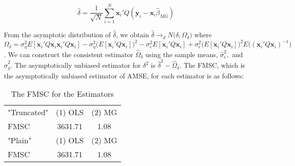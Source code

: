 \[
\widehat{\delta} = \frac{1}{\sqrt{N}} \sum_{i=1}^N \mathbf{x}_i'Q(\mathbf{y}_i - \mathbf{x}_i \widehat{\beta}_{MG})
\]

From the asymptotic distribution of $\widehat{\delta}$, we obtain $\widehat{\delta} \rightarrow_d N\big(\delta , \Omega_\delta\big)$ where $\Omega_\delta = \sigma_\eta^2 E[\mathbf{x}_i'Q \mathbf{x}_i \mathbf{x}_i'Q\mathbf{x}_i] - \sigma_\eta^2 \big(E[\mathbf{x}_i'Q\mathbf{x}_i]\big)^2 - \sigma_\epsilon^2 E[\mathbf{x}_i'Q\mathbf{x}_i] + \sigma_\epsilon^2 \big(E[\mathbf{x}_i'Q\mathbf{x}_i]\big)^2 E\big((\mathbf{x}_i'Q\mathbf{x}_i)^{-1}\big)$. We can construct the consistent estimator $\widehat{\Omega}_\delta$ using the sample means, $\widehat{\sigma}_\epsilon^2,$ and $\widehat{\sigma}_\eta^2$. The asymptotically unbiased estimator for $\delta^2$ is $\widehat{\delta}^2 - \widehat{\Omega}_\delta$. The FMSC, which is the asymptotically unbiased estimator of AMSE, for each estimator is as follows:

\begin{table}[htbp]\centering
\caption{The FMSC for the Estimators}
\begin{tabular}{l  c c  }
\hline
\hline
"Truncated"& (1) OLS & (2) MG\\ 
FMSC &  3631.71 & 1.08\\
\hline
"Plain"& (1) OLS & (2) MG\\ 
FMSC &  3631.71 & 1.08\\
\hline
\hline
\end{tabular}
\end{table}



